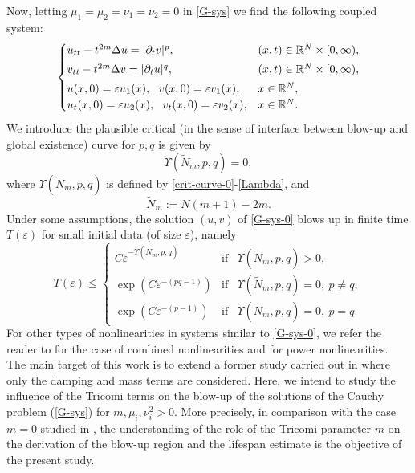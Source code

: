 \documentclass[12pt,leqno]{amsart}
\numberwithin{equation}{section}
\theoremstyle{remark}
\def\R{{\mathbb{R}}}
\def\d{\displaystyle}
\def\e{{\varepsilon}}
\begin{document}
Now, letting $\mu_1 = \mu_2 = \nu_1=\nu_2= 0$ in \eqref{G-sys} we find the following coupled system:
\begin{align}\label{G-sys-0}
\begin{cases} u_{tt}-t^{2m}\Delta u =|\partial_t v|^p, &   
 (x,t) \in \R^N\times[0,\infty), \vspace{.1cm}\\
 v_{tt}-t^{2m}\Delta v =|\partial_t u|^q, &   
 (x,t) \in \R^N\times[0,\infty), \vspace{.1cm}\\
u(x,0)=\e u_1(x), \ \ v(x,0)=\e  v_1(x), & x\in \mathbb{R}^N, \\ u_t(x,0)=\e u_2(x), \ \  v_t(x,0)=\varepsilon v_2(x), & x\in \mathbb{R}^N.
\end{cases}
\end{align}
We introduce  the plausible critical (in the sense of interface between blow-up and global existence) curve for $p,q$ is given by
\begin{equation}\label{crit-curve-0-1}
\Upsilon(\tilde{N}_m,p,q)=0,
\end{equation}
where $\Upsilon(\tilde{N}_m,p,q)$ is defined by \eqref{crit-curve-0}-\eqref{Lambda}, and 
\begin{equation}\label{Lambda1}
\d \tilde{N}_m:=N(m+1)-2m.
\end{equation}
Under some assumptions, the solution $(u,v)$ of \eqref{G-sys-0} blows up in finite time $T(\e)$ for small initial data (of size $\e$),  namely 
\begin{equation}\label{Teps}
T(\e) \le \left\{
\begin{array}{lll}
C \e^{-\Upsilon(\tilde{N}_m,p,q)}& \text{if}&\Upsilon(\tilde{N}_m,p,q)>0,\\
\exp(C \e^{-(pq-1)})& \text{if}&\Upsilon(\tilde{N}_m,p,q)=0, \ p \neq q,\\
\exp(C \e^{-(p-1)})& \text{if}&\Upsilon(\tilde{N}_m,p,q)=0, \ p = q.
\end{array}
\right.
\end{equation}
For other types of nonlinearities in systems similar to \eqref{G-sys-0}, we refer the reader to \cite{Ikeda} for the case of combined nonlinearities and \cite{Fan et al} for  power nonlinearities. \\







The main target of this work is to extend a former study carried out in \cite{Our9} where only the damping and mass terms are considered. Here, we intend to study the influence of the Tricomi terms  on the blow-up of the solutions of   the Cauchy problem (\ref{G-sys}) for $m,\mu_i, \nu_i^2>0$. More precisely, in comparison with the case $m=0$ studied in \cite{Our9}, the understanding  of the role of the Tricomi parameter $m$ on the derivation of the blow-up region and the lifespan estimate is the objective of the present study.  \\
\end{document}
